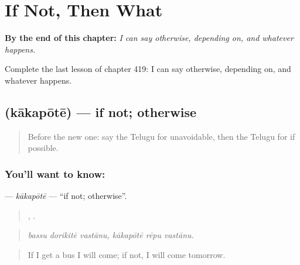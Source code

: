 
\chapter{If Not, Then What}
\label{ch:te-if-not-then-what}

\begin{chapteropening}
\textbf{By the end of this chapter:} \emph{I can say otherwise, depending on, and whatever happens.}

Complete the last lesson of chapter 419: I can say otherwise, depending on, and whatever happens.
\end{chapteropening}

\section[\texorpdfstring{\te{కాకపోతే} (kākapōtē)}{కాకపోతే (kākapōtē)}]{ (kākapōtē) — if not; otherwise}

\label{lesson:TE-C419-kakapote}



\begin{quote}
Before the new one: say the Telugu for unavoidable, then the Telugu for if possible.
\end{quote}

\subsection*{You'll want to know: }
\textbf{} — \emph{kākapōtē} — \textquotedblleft{}if not; otherwise\textquotedblright{}.

\begin{quote}
  ,   .
\end{quote}

\begin{quote}
\emph{bassu dorikitē vastānu, kākapōtē rēpu vastānu.}
\end{quote}

\begin{quote}
If I get a bus I will come; if not, I will come tomorrow.
\end{quote}

